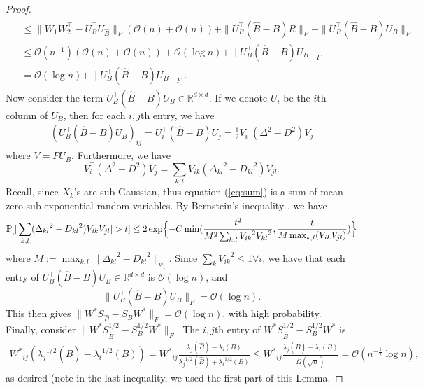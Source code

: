 \begin{proof}
\begin{align*}
\begin{array}{rl}
      & \leq  \|W_1 W_2^{\top} - U_B^{\top} {U_{\hat{B}}}\|_{F} (\mathcal{O}(n) + \mathcal{O}(n)) + \| U_B^{\top} (\hat{B} - B) R \|_{F} + \| U_B^{\top} (\hat{B} - B) U_B \|_{F} \\
      & \leq \mathcal{O}(n^{-1}) (\mathcal{O}(n) + \mathcal{O}(n)) + \mathcal{O}(\log n)  + \| U_B^{\top} (\hat{B} - B) U_B \|_{F} \\
      & = \mathcal{O}( \log n) + \| U_B^{\top} (\hat{B} - B) U_B \|_{F}.
     \end{array}
   \end{align*}
   Now consider the term $ U_B^{\top} (\hat{B} - B) U_B \in \mathbb{R}^{d \times d}$. If we denote $U_i$ be the $i$th column of $U_B$, then for each $i, j$th entry, we have 
   \begin{align*}
    ( U_B^{\top} (\hat{B} - B) U_B )_{ij} = U_i^{\top} (\hat{B} -B) U_j = \frac{1}{2} V_{i}^{\top} (\Delta^2 - D^2) V_j
   \end{align*}
   where $V = P U_B$.
    Furthermore, we have
    \begin{equation} \label{eq:sum}
    V_{i}^{\top} (\Delta^2 - D^2) V_j = \sum\limits_{k,l} V_{ik} ({\Delta_{kl}}^2 - {D_{kl}}^2) V_{jl}.
    \end{equation}
 Recall, since $X_k$'s are sub-Gaussian, thus equation (\ref{eq:sum}) is a sum of mean zero sub-exponential random variables. By Bernstein's inequality \citep{HDP}, we have
 $$ \mathbb{P}[ |\sum\limits_{k,l} ({\Delta_{kl}}^2 - {D_{kl}}^2) V_{ik} V_{jl} | > t] \leq  2 \exp \Bigl\{-C \min (\frac{t^2}{M^2 \sum_{k,l} {V_{ik}}^2{V_{kl}}^2}, \frac{t}{M \max_{k,l} ( V_{ik} V_{jl})}) \Bigr \} $$  
 where $M := \max_{k,l} \| {\Delta_{kl}}^2 - {D_{kl}}^2 \|_{\psi_1} $.
 Since $\sum_{k} {V_{ik}}^2 \leq 1 \forall i $, we have that each entry of $ U_B^{\top} (\hat{B} - B) U_B  \in \mathbb{R}^{d \times d}$ is $\mathcal{O}(\log n)$, and 
 \begin{equation}
 \label{important_bound}
 \| U_B^{\top} (\hat{B} - B) U_B \|_{F} = \mathcal{O} (\log n).
 \end{equation}
 This then gives $\|W^{*}S_{\hat{B}} - S_{B}W^{*}\|_{F} = \mathcal{O}(\log n)$, with high probability.\\
    Finally, consider $ \|W^{*} S_{\hat{B}}^{1/2} - S_{B}^{1/2} W^{*}\|_{F}.$ The $i, j$th entry of $W^{*} S_{\hat{B}}^{1/2} - S_{B}^{1/2} W^{*}$ is 
    \begin{align*}
    {{W^{*}}_{ij}} ( {\lambda_{j}}^{1/2}(\hat{B}) -  {\lambda_{i}}^{1/2}({B})) 
    = {{W^{*}}_{ij}} \frac{{\lambda_{j}}(\hat{B}) -  {\lambda_{i}}({B})} {{\lambda_{j}}^{1/2}(\hat{B}) +  {\lambda_{i}}^{1/2}({B})} 
     \leq {{W^{*}}_{ij}} \frac{{\lambda_{j}}(\hat{B}) -  {\lambda_{i}}({B})}{\Omega(\sqrt{n})} 
     = \mathcal{O}(n^{-\frac{1}{2}} \log  n),
    \end{align*}
    as desired (note in the last inequality, we used the first part of this Lemma.
\end{proof}
